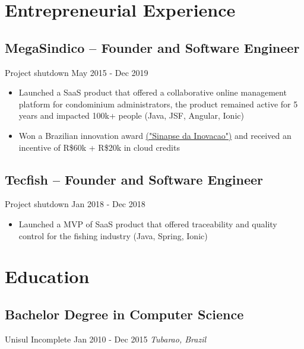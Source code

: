 \documentclass[11pt, a4paper]{article}
\begin{document}
\section*{Entrepreneurial Experience}
\subsection*{MegaSindico -- Founder and Software Engineer}
Project shutdown \hfill May 2015 - Dec 2019
\begin{itemize}[noitemsep]
    \item Launched a SaaS product that offered a collaborative online management platform for condominium administrators, the product remained active for 5 years and impacted 100k+ people (Java, JSF, Angular, Ionic)
    \item Won a Brazilian innovation award \href{https://certi.org.br/pt/cases-sinapse-da-inovacao}{("Sinapse da Inovacao")} and received an incentive of R\$60k + R\$20k in cloud credits
\end{itemize}

\subsection*{Tecfish -- Founder and Software Engineer}
Project shutdown \hfill Jan 2018 - Dec 2018
\begin{itemize}[noitemsep]
    \item Launched a MVP of SaaS product that offered traceability and quality control for the fishing industry (Java, Spring, Ionic)
\end{itemize}

\section*{Education}
\subsection*{Bachelor Degree in Computer Science}
Unisul \hfill Incomplete \hfill Jan 2010 - Dec 2015
\textit{Tubarao, Brazil}
\end{document}
